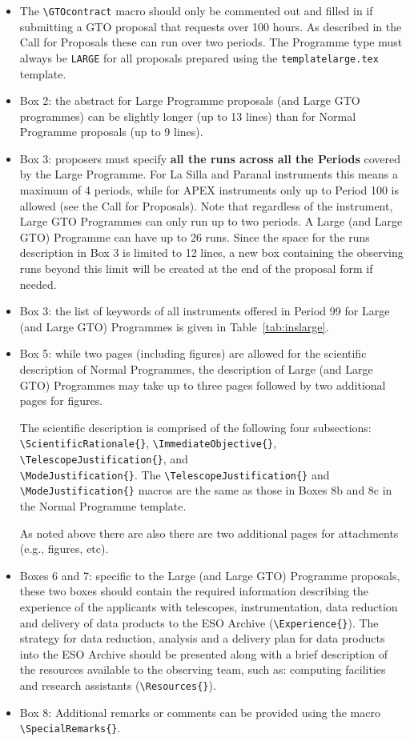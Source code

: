 \documentclass{article}
\begin{document}
\begin{itemize}
\item The \verb|\GTOcontract| macro should only be commented out and filled in if submitting 
a GTO proposal that requests over 100 hours. As described in the Call for Proposals these can run over two periods. The Programme type must always be {\tt LARGE} for all proposals
prepared using the {\tt templatelarge.tex} template. 
\item Box 2: the abstract for Large Programme proposals (and Large GTO programmes) can be
  slightly longer (up to 13 lines) than for Normal Programme proposals
  (up to 9 lines).  
\item Box 3: proposers must specify {\bf all the runs across all the
    Periods} covered by the Large Programme. 
For La Silla and Paranal instruments this means a maximum of 4 periods, while for APEX
instruments only up to Period 100 is allowed (see the Call for Proposals). 
Note that regardless of the instrument, Large GTO Programmes can only run up to two periods.
A Large (and Large GTO) Programme can have up to 26 runs. Since the space for the runs
  description in Box 3 is limited to 12 lines, a new box containing
  the observing runs beyond this limit will be created at the end of
  the proposal form if needed.
\item Box 3: the list of keywords of all instruments offered in Period
  99 for Large (and Large GTO) Programmes is given in
  Table~\ref{tab:inslarge}.
\item Box 5: while two pages (including figures) are allowed for the scientific
  description of Normal Programmes, the
  description of Large (and Large GTO) Programmes may take up to three pages followed by
  two additional pages for figures.

  The scientific description is comprised of the following four subsections:
  \verb|\ScientificRationale{}|,
  \verb|\ImmediateObjective{}|, \verb|\TelescopeJustification{}|, and\\
  \verb|\ModeJustification{}|.  
  The \verb|\TelescopeJustification{}| and \verb|\ModeJustification{}|
  macros are the same as those in Boxes 8b and 8c in the Normal Programme
  template.
  
  As noted above there are also there are two additional pages for
  attachments (e.g., figures, etc). 
\item Boxes 6 and 7: specific to the Large (and Large GTO) Programme proposals, these
  two boxes should contain the required information describing the
  experience of the applicants with telescopes, instrumentation, 
  data reduction  and delivery of data products to the ESO Archive 
  (\verb|\Experience{}|). The strategy for data reduction, analysis 
  and a delivery plan for data products into the ESO Archive should 
  be presented along with a brief description of the resources available
  to the observing team, such as: computing facilities and research
  assistants (\verb|\Resources{}|).
\item Box 8: Additional remarks or comments can be provided using
  the macro \verb|\SpecialRemarks{}|.
\end{itemize} 
\end{document}
